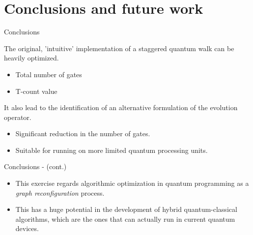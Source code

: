 \documentclass{beamer}
\begin{document}
\section{Conclusions and future work}
\begin{frame}{Conclusions}	
	
	The original, 'intuitive' implementation of a staggered quantum walk can be heavily optimized.
	\begin{itemize}
		\item Total number of gates
		\item T-count value
	\end{itemize}
	
	It also lead to the identification of an alternative formulation of the evolution operator.
	\begin{itemize}
		\item Significant reduction in the number of gates.
		\item Suitable for running on more limited quantum processing units.
	\end{itemize}
\end{frame}
\begin{frame}{Conclusions - (cont.)}	
	\begin{itemize}
		\item This exercise regards algorithmic optimization  in quantum programming  as a \emph{graph reconfiguration} process. 
		\item This has a huge potential in the development of hybrid quantum-classical algorithms, which are the ones that can actually run in current quantum devices.
	\end{itemize}
\end{frame}
\end{document}
